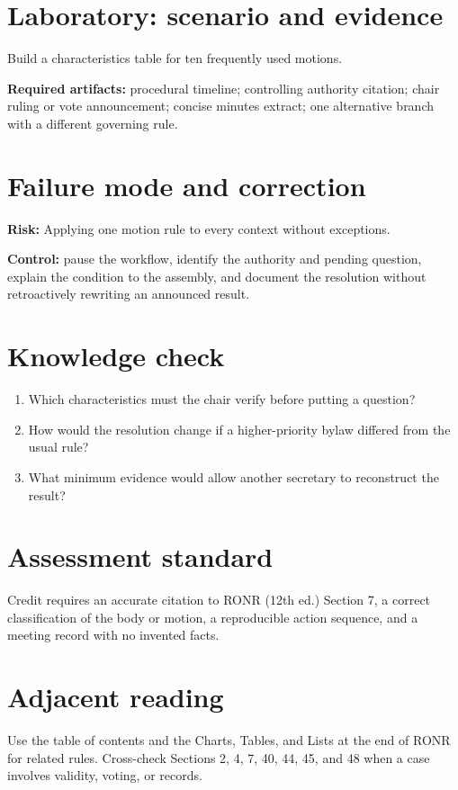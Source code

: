 \documentclass[11pt]{article}
\begin{document}
\section{Laboratory: scenario and evidence}
Build a characteristics table for ten frequently used motions.

\textbf{Required artifacts:} procedural timeline; controlling authority citation; chair ruling or vote announcement; concise minutes extract; one alternative branch with a different governing rule.

\section{Failure mode and correction}
\textbf{Risk:} Applying one motion rule to every context without exceptions.

\textbf{Control:} pause the workflow, identify the authority and pending question, explain the condition to the assembly, and document the resolution without retroactively rewriting an announced result.

\section{Knowledge check}
\begin{enumerate}[leftmargin=*,itemsep=4pt]
\item Which characteristics must the chair verify before putting a question?
\item How would the resolution change if a higher-priority bylaw differed from the usual rule?
\item What minimum evidence would allow another secretary to reconstruct the result?
\end{enumerate}

\section{Assessment standard}
Credit requires an accurate citation to RONR (12th ed.) Section 7, a correct classification of the body or motion, a reproducible action sequence, and a meeting record with no invented facts.

\section{Adjacent reading}
Use the table of contents and the Charts, Tables, and Lists at the end of RONR for related rules. Cross-check Sections 2, 4, 7, 40, 44, 45, and 48 when a case involves validity, voting, or records.
\end{document}
